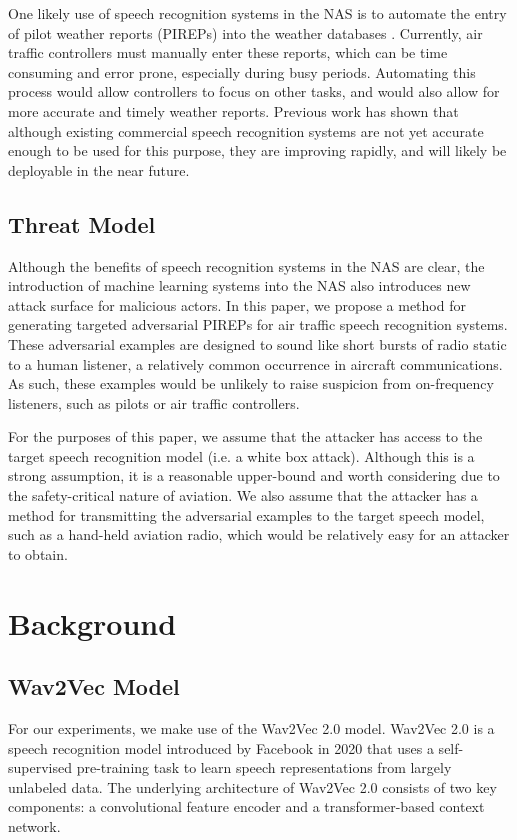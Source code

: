 One likely use of speech recognition systems in the NAS is to automate the entry
of pilot weather reports (PIREPs) into the weather databases
\cite{carstens2022accuracy}. Currently, air traffic controllers must manually
enter these reports, which can be time consuming and error prone, especially
during busy periods. Automating this process would allow controllers to focus on
other tasks, and would also allow for more accurate and timely weather reports.
Previous work \cite{carstens2022accuracy} has shown that although existing
commercial speech recognition systems are not yet accurate enough to be used for
this purpose, they are improving rapidly, and will likely be deployable in the
near future.

\subsection{Threat Model}

Although the benefits of speech recognition systems in the NAS are clear, the
introduction of machine learning systems into the NAS also introduces new
attack surface for malicious actors. In this paper, we propose a method for
generating targeted adversarial PIREPs for air traffic speech recognition
systems. These adversarial examples are designed to sound like short bursts of
radio static to a human listener, a relatively common occurrence in aircraft
communications. As such, these examples would be unlikely to raise suspicion
from on-frequency listeners, such as pilots or air traffic controllers.

For the purposes of this paper, we assume that the attacker has access to the
target speech recognition model (i.e. a white box attack). Although this is a
strong assumption, it is a reasonable upper-bound and worth considering due to
the safety-critical nature of aviation. We also assume that the attacker has
a method for transmitting the adversarial examples to the target speech model,
such as a hand-held aviation radio, which would be relatively easy for an
attacker to obtain.

\section{Background}

\subsection{Wav2Vec Model}

For our experiments, we make use of the Wav2Vec 2.0 \cite{baevski2020wav2vec}
model. Wav2Vec 2.0 is a speech recognition model introduced by Facebook in 2020
that uses a self-supervised pre-training task to learn speech representations
from largely unlabeled data. The underlying architecture of Wav2Vec 2.0 consists
of two key components: a convolutional feature encoder and a transformer-based
context network.

